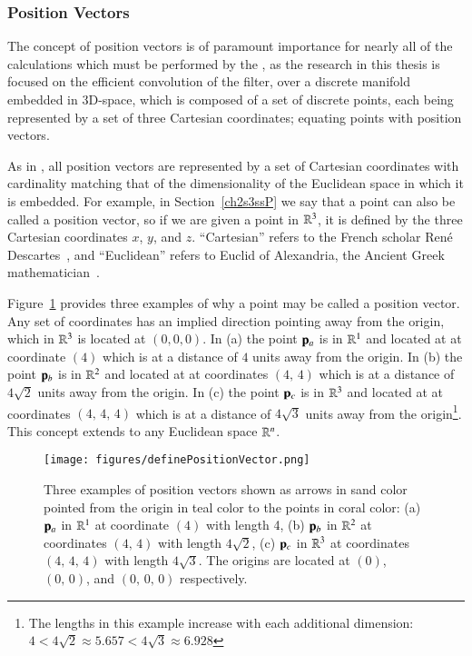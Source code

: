 %
%
\subsubsection{Position Vectors}
\label{ch2sETBssLAsssPV}
The concept of position vectors is of paramount importance for nearly all of the calculations which must be performed by the , as the research in this thesis is focused on the efficient convolution of the filter, over a discrete manifold embedded in 3D-space, which is composed of a set of discrete points, each being represented by a set of three Cartesian coordinates; equating points with position vectors.

As in \tdd{}, all position vectors are represented by a set of Cartesian coordinates with cardinality matching that of the dimensionality of the Euclidean space in which it is embedded. For example, in Section~\ref{ch2s3ssP} we say that a point can also be called a position vector, so if we are given a point in $\mathbb{R}^{3}$, it is defined by the three Cartesian coordinates $x$, $y$, and $z$. ``Cartesian'' refers to the French scholar René Descartes~\cite{EB1}, and ``Euclidean'' refers to Euclid of Alexandria, the Ancient Greek mathematician~\cite{EB2}.

Figure~\ref{fig:definePositionVector} provides three examples of why a point may be called a position vector. Any set of coordinates has an implied direction pointing away from the origin, which in $\mathbb{R}^{3}$ is located at $(0, 0, 0)$. In (a) the point $\mathbf{p}_a$ is in $\mathbb{R}^{1}$ and located at at coordinate $(4)$ which is at a distance of $4$ units away from the origin. In (b) the point $\mathbf{p}_b$ is in $\mathbb{R}^{2}$ and located at at coordinates $(4,\,4)$ which is at a distance of $4\sqrt{2}$ units away from the origin. In (c) the point $\mathbf{p}_c$ is in $\mathbb{R}^{3}$ and located at at coordinates $(4,\,4,\,4)$ which is at a distance of $4\sqrt{3}$ units away from the origin\footnote{The lengths in this example increase with each additional dimension: $4 < 4\sqrt{2} \approx 5.657 < 4\sqrt{3} \approx 6.928$}. This concept extends to any Euclidean space $\mathbb{R}^{n}$.

\begin{figure}[ht]
\ffigbox
	{\texttt{[image: figures/definePositionVector.png]}}
	{\caption[Examples of Position Vector]{Three examples of position vectors shown as arrows in sand color pointed from the origin in teal color to the points in coral color: (a) $\mathbf{p}_a$ in $\mathbb{R}^{1}$ at coordinate $(4)$ with length 4, (b) $\mathbf{p}_b$ in $\mathbb{R}^{2}$ at coordinates $(4,\,4)$ with length $4\sqrt{2}$, (c) $\mathbf{p}_c$ in $\mathbb{R}^{3}$ at coordinates $(4,\,4,\,4)$ with length $4\sqrt{3}$. The origins are located at $(0)$, $(0,\,0)$, and $(0,\,0,\,0)$ respectively.}\label{fig:definePositionVector}}
\end{figure}

